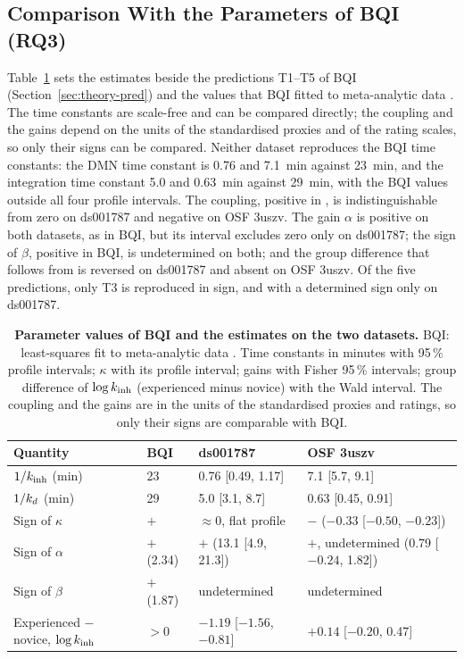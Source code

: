 \subsection{Comparison With the Parameters of BQI (RQ3)}
\label{sec:res-bqi}
Table~\ref{tab:bqi} sets the estimates beside the predictions T1--T5 of BQI (Section~\ref{sec:theory-pred}) and the values that BQI fitted to meta-analytic data \cite[Table~5]{BQI}. The time constants are scale-free and can be compared directly; the coupling and the gains depend on the units of the standardised proxies and of the rating scales, so only their signs can be compared. Neither dataset reproduces the BQI time constants: the DMN time constant is 0.76 and 7.1~min against 23~min, and the integration time constant 5.0 and 0.63~min against 29~min, with the BQI values outside all four profile intervals. The coupling, positive in \cite[eq.~(53)]{BQI}, is indistinguishable from zero on ds001787 and negative on OSF 3uszv. The gain $\alpha$ is positive on both datasets, as in BQI, but its interval excludes zero only on ds001787; the sign of $\beta$, positive in BQI, is undetermined on both; and the group difference that follows from \cite[eq.~(51) and Sec.~7.5]{BQI} is reversed on ds001787 and absent on OSF 3uszv. Of the five predictions, only T3 is reproduced in sign, and with a determined sign only on ds001787.

\begin{table}[t]
\caption{\textbf{Parameter values of BQI and the estimates on the two datasets.} BQI: least-squares fit to meta-analytic data \cite[Table~5]{BQI}. Time constants in minutes with 95\,\% profile intervals; $\kappa$ with its profile interval; gains with Fisher 95\,\% intervals; group difference of $\log k_{\mathrm{inh}}$ (experienced minus novice) with the Wald interval. The coupling and the gains are in the units of the standardised proxies and ratings, so only their signs are comparable with BQI.}
\label{tab:bqi}
\centering\footnotesize
\setlength{\tabcolsep}{5pt}
\begin{tabular}{llll}
\toprule
Quantity & BQI & ds001787 & OSF 3uszv \\
\midrule
$1/k_{\mathrm{inh}}$ (min) & 23 & 0.76 [0.49, 1.17] & 7.1 [5.7, 9.1] \\
$1/k_{d}$ (min) & 29 & 5.0 [3.1, 8.7] & 0.63 [0.45, 0.91] \\
Sign of $\kappa$ & $+$ & $\approx0$, flat profile & $-$ ($-0.33$ [$-0.50$, $-0.23$]) \\
Sign of $\alpha$ & $+$ (2.34) & $+$ (13.1 [4.9, 21.3]) & $+$, undetermined (0.79 [$-0.24$, 1.82]) \\
Sign of $\beta$ & $+$ (1.87) & undetermined & undetermined \\
Experienced $-$ novice, $\log k_{\mathrm{inh}}$ & $>0$ & $-1.19$ [$-1.56$, $-0.81$] & $+0.14$ [$-0.20$, 0.47] \\
\bottomrule
\end{tabular}
\end{table}

